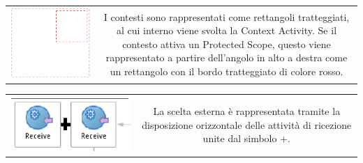 
\begin{tabular}{c c}
\hline
\parbox[c][4cm][c]{0.2 \textwidth}
{\includegraphics[scale=0.30]{blide/dia/BlideContext}} & 
\parbox[c][4cm][c]{0.6 \textwidth}{I contesti sono rappresentati come
rettangoli tratteggiati, al cui interno viene svolta la Context Activity. Se il
contesto attiva un Protected Scope, questo viene rappresentato a partire
dell'angolo in alto a destra come un rettangolo con il bordo tratteggiato di
colore rosso.}\\
\end{tabular}

\begin{tabular}{c c}
\hline
\parbox[c][2.5cm][c]{0.2 \textwidth}
{\includegraphics[scale=0.42]{blide/dia/BlidePick}} & 
\parbox[c][2.5cm][c]{0.6 \textwidth}{La scelta esterna è rappresentata tramite
la disposizione orizzontale delle attività di ricezione unite dal simbolo +.}\\
\end{tabular}


